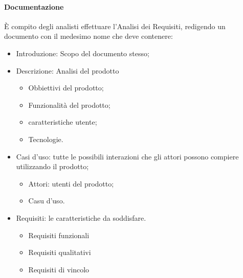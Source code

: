 \documentclass{article}
\begin{document}
\paragraph{Documentazione}
È compito degli analisti effettuare l'Analisi dei Requisiti, redigendo un documento con il
medesimo nome che deve contenere:
\begin{itemize}
    \item Introduzione: Scopo del documento stesso;
    \item Descrizione: Analisi del prodotto
    \begin{itemize}
        \item Obbiettivi del prodotto;
        \item Funzionalità del prodotto;
       \item caratteristiche utente;
       \item Tecnologie.
    \end{itemize}
    \item  Casi d'uso: tutte le possibili interazioni che gli attori possono compiere utilizzando il prodotto;
    \begin{itemize}
        \item Attori: utenti del prodotto;
        \item Casu d'uso.
    \end{itemize}
    \item Requisiti: le caratteristiche da soddisfare.
    \begin{itemize}
        \item Requisiti funzionali
        \item Requisiti qualitativi
       \item Requisiti di vincolo
    \end{itemize}
\end{itemize}
\end{document}
